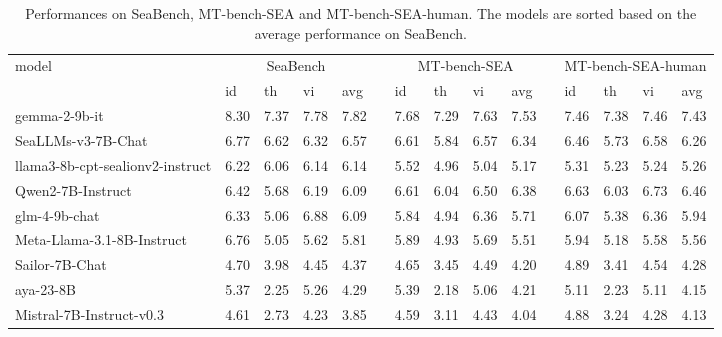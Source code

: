 \begin{table*}[!ht]
    \centering
    \small
    \setlength\tabcolsep{5pt}
    \begin{tabular}{lllllllllllllll}
        \toprule
         \multirow{2}{*}{model}& \multicolumn{4}{c}{SeaBench} & & \multicolumn{4}{c}{MT-bench-SEA} & & \multicolumn{4}{c}{MT-bench-SEA-human}\\ 
         \cmidrule{2-5} \cmidrule{7-10} \cmidrule{12-15}
         & id & th & vi & avg & & id & th & vi & avg & & id & th & vi & avg \\ 
        \midrule
        gemma-2-9b-it & 8.30 & 7.37 & 7.78 & 7.82 & & 7.68 & 7.29 & 7.63 & 7.53 & & 7.46 & 7.38 & 7.46 & 7.43 \\ 
        SeaLLMs-v3-7B-Chat & 6.77 & 6.62 & 6.32 & 6.57 & & 6.61 & 5.84 & 6.57 & 6.34 & & 6.46 & 5.73 & 6.58 & 6.26 \\ 
        llama3-8b-cpt-sealionv2-instruct & 6.22 & 6.06 & 6.14 & 6.14 & & 5.52 & 4.96 & 5.04 & 5.17 & & 5.31 & 5.23 & 5.24 & 5.26 \\ 
        Qwen2-7B-Instruct & 6.42 & 5.68 & 6.19 & 6.09 & & 6.61 & 6.04 & 6.50 & 6.38 & & 6.63 & 6.03 & 6.73 & 6.46 \\ 
        glm-4-9b-chat & 6.33 & 5.06 & 6.88 & 6.09 & & 5.84 & 4.94 & 6.36 & 5.71 & & 6.07 & 5.38 & 6.36 & 5.94 \\ 
        Meta-Llama-3.1-8B-Instruct & 6.76 & 5.05 & 5.62 & 5.81 & & 5.89 & 4.93 & 5.69 & 5.51 & & 5.94 & 5.18 & 5.58 & 5.56 \\ 
        Sailor-7B-Chat & 4.70 & 3.98 & 4.45 & 4.37 & & 4.65 & 3.45 & 4.49 & 4.20 & & 4.89 & 3.41 & 4.54 & 4.28 \\ 
        aya-23-8B & 5.37 & 2.25 & 5.26 & 4.29 & & 5.39 & 2.18 & 5.06 & 4.21 & & 5.11 & 2.23 & 5.11 & 4.15 \\ 
        Mistral-7B-Instruct-v0.3 & 4.61 & 2.73 & 4.23 & 3.85 & & 4.59 & 3.11 & 4.43 & 4.04 & & 4.88 & 3.24 & 4.28 & 4.13 \\ 
        \bottomrule
    \end{tabular}
    \caption{Performances on SeaBench, MT-bench-SEA and  MT-bench-SEA-human. The models are sorted based on the average performance on SeaBench.}
    \label{tab:SeaBench_results}
\end{table*}


